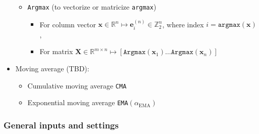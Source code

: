 \documentclass[fleqn]{article}
\begin{document}
\begin{itemize}
\begin{itemize}
            \item \texttt{Argmax} (to vectorize or matricize \texttt{argmax})
                \begin{itemize}
                    \item For column vector
                        $\mathbf{x} \in \mathbb{R}^{n} \longmapsto
                        \mathbf{e}^{(n)}_i \in \mathbb{Z}_2^n$,
                        where index $i = \texttt{argmax}(\mathbf{x})$,
                    \item For matrix
                        $\mathbf{X} \in \mathbb{R}^{m \times n} \longmapsto
                        \left[
                            \texttt{Argmax}(\mathbf{x}_1)
                            \dots
                            \texttt{Argmax}(\mathbf{x}_n)
                        \right]
                        $
                \end{itemize}
        \end{itemize}
    \item Moving average (TBD):
        \begin{itemize}
            \item Cumulative moving average \texttt{CMA}
            \item Exponential moving average \texttt{EMA}$(\alpha_{\mathrm{EMA}})$
        \end{itemize}
\end{itemize}


\subsubsection*{General inputs and settings}
\end{document}
